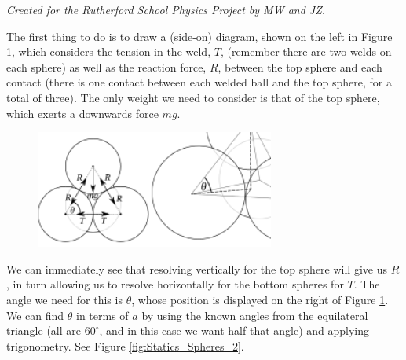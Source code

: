 
\begin{problem}
{
}
{\textit{Created for the Rutherford School Physics Project by MW and JZ.}}
{
The first thing to do is to draw a (side-on) diagram, shown on the left in Figure \ref{fig:Statics_Spheres_1}, which considers the tension in the weld, $T$, (remember there are two welds on each sphere) as well as the reaction force, $R$, between the top sphere and each contact (there is one contact between each welded ball and the top sphere, for a total of three). The only weight we need to consider is that of the top sphere, which exerts a downwards force $mg$.

\begin{figure}[h]
	\centering
	\includegraphics[width=0.7\textwidth]{../../../figures/Statics_Spheres_1.svg}
	\caption{}	
	\label{fig:Statics_Spheres_1}
\end{figure}

We can immediately see that resolving vertically for the top sphere will give us $R$, in turn allowing us to resolve horizontally for the bottom spheres for $T$. The angle we need for this is $\theta$, whose position is displayed on the right of Figure \ref{fig:Statics_Spheres_1}. We can find $\theta$ in terms of $a$ by using the known angles from the equilateral triangle (all are $60 ^{\circ}$, and in this case we want half that angle) and applying trigonometry. See Figure \ref{fig:Statics_Spheres_2}. 

}
\end{problem}
